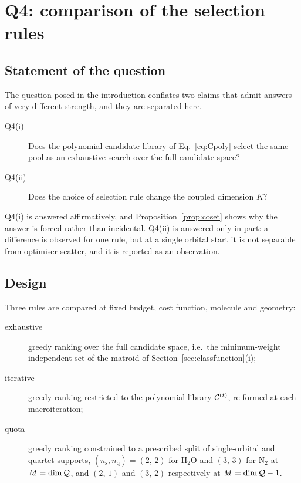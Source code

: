 
\section{Q4: comparison of the selection rules}
\label{sec:q4}

\subsection{Statement of the question}

The question posed in the introduction conflates two claims that admit answers
of very different strength, and they are separated here.

\begin{description}
\item[Q4(i)] Does the polynomial candidate library of
  Eq.~\eqref{eq:Cpoly} select the same pool as an exhaustive search over
  the full candidate space?
\item[Q4(ii)] Does the choice of selection rule change the coupled dimension
  $K$?
\end{description}

Q4(i) is answered affirmatively, and Proposition~\ref{prop:coset} shows why the
answer is forced rather than incidental. Q4(ii) is answered only in part: a
difference is observed for one rule, but at a single orbital start it is not
separable from optimiser scatter, and it is reported as an observation.

\subsection{Design}

Three rules are compared at fixed budget, cost function, molecule and geometry:

\begin{description}
\item[exhaustive] greedy ranking over the full candidate space, i.e.\ the
  minimum-weight independent set of the matroid of
  Section~\ref{sec:classfunction}(i);
\item[iterative] greedy ranking restricted to the polynomial library
  $\mathcal C^{(t)}$, re-formed at each macroiteration;
\item[quota] greedy ranking constrained to a prescribed split of single-orbital
  and quartet supports, $(n_{\mathrm{s}},n_{\mathrm{q}})=(2,\,2)$ for
  $\mathrm{H_2O}$ and $(3,\,3)$ for $\mathrm{N_2}$ at $M=\dim\mathcal Q$, and $(2,\,1)$ and $(3,\,2)$
  respectively at $M=\dim\mathcal Q-1$.
\end{description}

